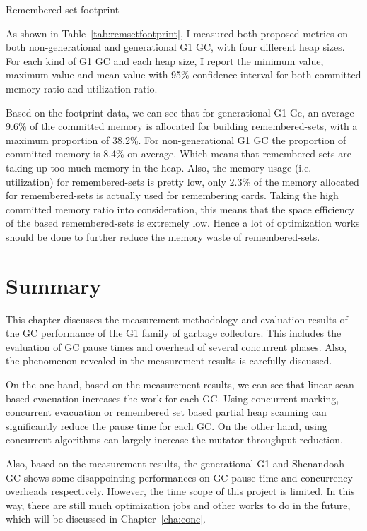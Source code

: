 \begin{table*}
  \centering
  
  \caption{Remembered set footprint}
  \label{tab:remsetfootprint}
\end{table*}

As shown in Table~\ref{tab:remsetfootprint}, I measured both proposed metrics
on both non-generational and generational G1 GC, with four different heap sizes.
For each kind of G1 GC and each heap size, I report the minimum value, maximum value and mean value
with 95\% confidence interval for both committed memory ratio and utilization ratio.

Based on the footprint data, we can see that for generational G1 Gc,
an average 9.6\% of the committed memory
is allocated for building remembered-sets, with a maximum proportion of 38.2\%.
For non-generational G1 GC the proportion of committed memory is 8.4\% on average.
Which means that remembered-sets are taking up too much memory in the heap. 
Also, the memory usage (i.e. utilization) for remembered-sets is pretty low,
only 2.3\% of the memory allocated for remembered-sets is actually used for remembering cards.
Taking the high committed memory ratio into consideration, this means that the
space efficiency of the  based remembered-sets is extremely
low. Hence a lot of optimization works should be done to further reduce the memory
waste of remembered-sets.

\section{Summary} %
\label{sec:summary}

This chapter discusses the measurement methodology and evaluation results of the
GC performance of the G1 family of garbage collectors. This includes the evaluation of
GC pause times and overhead of several concurrent phases. Also, the phenomenon revealed
in the measurement results is carefully discussed.

On the one hand, based on the measurement results, we can see that linear scan based evacuation
increases the work for each GC. Using concurrent marking, concurrent evacuation
or remembered set based partial heap scanning can significantly reduce the pause time
for each GC. On the other hand, using concurrent algorithms can largely increase the
mutator throughput reduction.

Also, based on the measurement results, the generational G1 and Shenandoah GC shows some
disappointing performances on GC pause time and concurrency overheads respectively.
However, the time scope of this project is limited.
In this way, there are still much optimization jobs and other works to do in the future,
which will be discussed in Chapter~\ref{cha:conc}.




